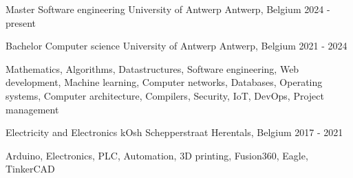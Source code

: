 

\begin{cventries}

  \cventry
    {Master Software engineering} %
    {University of Antwerp} %
    {Antwerp, Belgium} %
    {2024 - present} %
    {
    }

  \cventry
    {Bachelor Computer science} %
    {University of Antwerp} %
    {Antwerp, Belgium} %
    {2021 - 2024} %
    {
      \begin{cvitems} %
        \item {Mathematics, Algorithms, Datastructures, Software engineering, Web development, Machine learning, Computer networks, Databases, Operating systems, Computer architecture, Compilers, Security, IoT, DevOps, Project management}
      \end{cvitems}
    }

  \cventry
    {Electricity and Electronics} %
    {kOsh Schepperstraat} %
    {Herentals, Belgium} %
    {2017 - 2021} %
    {
      \begin{cvitems} %
        \item {Arduino, Electronics, PLC, Automation, 3D printing, Fusion360, Eagle, TinkerCAD}
      \end{cvitems}
    }
\end{cventries}
